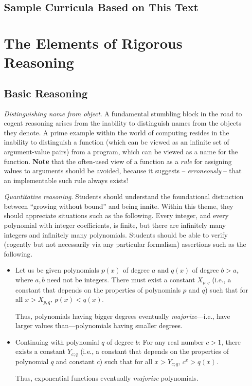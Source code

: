 \subsection{Sample Curricula Based on This Text}
\label{sec:sample-curricula}



\section{The Elements of Rigorous Reasoning}
\label{sec:elements-of-reasoning}

\subsection{Basic Reasoning}

{\em Distinguishing name from object}.
%
A fundamental stumbling block in the road to cogent reasoning arises
from the inability to distinguish names from the objects they denote.
A prime example within the world of computing resides in the inability
to distinguish a function (which can be viewed as an infinite set of
argument-value pairs) from a program, which can be viewed as a name
for the function.  {\bf Note} that the often-used view of a function
as a {\em rule} for assigning values to arguments should be avoided,
because it suggests -- \underline{\em erroneously} -- that an
implementable such rule always exists!

{\em Quantitative reasoning}.
%
Students should understand the foundational distinction between
``growing without bound'' and being innite.  Within this theme, they
should appreciate situations such as the following.  Every integer,
and every polynomial with integer coefficients, is finite, but there
are infinitely many integers and infinitely many polynomials.
Students should be able to verify (cogently but not necessarily via
any particular formalism) assertions such as the following.
\begin{itemize}
\item
Let us be given polynomials $p(x)$ of degree $a$ and $q(x)$ of degree
$b > a$, where $a, b$ need not be integers.  There must exist a
constant $X_{p,q}$ (i.e., a constant that depends on the properties of
polynomials $p$ and $q$) such that for all $x > X_{p,q}$, $p(x) <
q(x)$.

Thus, polynomials having bigger degrees eventually {\em
  majorize}---i.e., have larger values than---polynomials having
smaller degrees.

\item
Continuing with polynomial $q$ of degree $b$: For any real number $c >
1$, there exists a constant $Y_{c;q}$ (i.e., a constant that depends
on the properties of polynomial $q$ and constant $c$) such that for
all $x > Y_{c;q}$, $c^x > q(x)$.

Thus, exponential functions eventually {\em majorize} polynomials.
\end{itemize}

